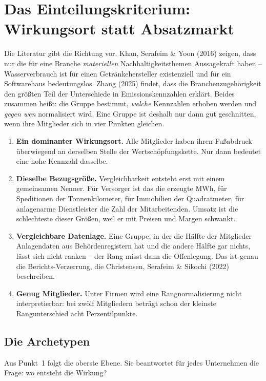 \documentclass[11pt,a4paper]{article}
\begin{document}
\section{Das Einteilungskriterium: Wirkungsort statt Absatzmarkt}

Die Literatur gibt die Richtung vor. Khan, Serafeim \& Yoon (2016) zeigen, dass nur die für eine Branche \emph{materiellen} Nachhaltigkeitsthemen Aussagekraft haben -- Wasserverbrauch ist für einen Getränkehersteller existenziell und für ein Softwarehaus bedeutungslos. Zhang (2025) findet, dass die Branchenzugehörigkeit den größten Teil der Unterschiede in Emissionskennzahlen erklärt. Beides zusammen heißt: die Gruppe bestimmt, \emph{welche} Kennzahlen erhoben werden und \emph{gegen wen} normalisiert wird. Eine Gruppe ist deshalb nur dann gut geschnitten, wenn ihre Mitglieder sich in vier Punkten gleichen.

\begin{enumerate}
\item \textbf{Ein dominanter Wirkungsort.} Alle Mitglieder haben ihren Fußabdruck überwiegend an derselben Stelle der Wertschöpfungskette. Nur dann bedeutet eine hohe Kennzahl dasselbe.
\item \textbf{Dieselbe Bezugsgröße.} Vergleichbarkeit entsteht erst mit einem gemeinsamen Nenner. Für Versorger ist das die erzeugte MWh, für Speditionen der Tonnenkilometer, für Immobilien der Quadratmeter, für anlagenarme Dienstleister die Zahl der Mitarbeitenden. Umsatz ist die schlechteste dieser Größen, weil er mit Preisen und Margen schwankt.
\item \textbf{Vergleichbare Datenlage.} Eine Gruppe, in der die Hälfte der Mitglieder Anlagendaten aus Behördenregistern hat und die andere Hälfte gar nichts, lässt sich nicht ranken -- der Rang misst dann die Offenlegung. Das ist genau die Berichts-Verzerrung, die Christensen, Serafeim \& Sikochi (2022) beschreiben.
\item \textbf{Genug Mitglieder.} Unter \MinSize{} Firmen wird eine Rangnormalisierung nicht interpretierbar: bei zwölf Mitgliedern beträgt schon der kleinste Rangunterschied acht Perzentilpunkte.
\end{enumerate}

\subsection{Die \NArchetypes{} Archetypen}

Aus Punkt~1 folgt die oberste Ebene. Sie beantwortet für jedes Unternehmen die Frage: wo entsteht die Wirkung?
\end{document}
